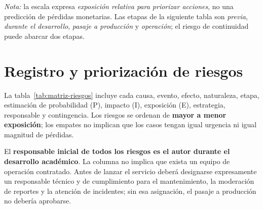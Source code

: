 \noindent\textit{Nota:} la escala expresa \emph{exposición relativa para priorizar acciones}, no una predicción de pérdidas monetarias. Las etapas de la siguiente tabla son \emph{previa}, \emph{durante el desarrollo}, \emph{pasaje a producción} y \emph{operación}; el riesgo de continuidad puede abarcar dos etapas.

\section{Registro y priorización de riesgos}\label{sec:ml-registro-riesgos}

La tabla~\ref{tab:matriz-riesgos} incluye cada causa, evento, efecto, naturaleza, etapa, estimación de probabilidad (P), impacto (I), exposición (E), estrategia, responsable y contingencia. Los riesgos se ordenan de \textbf{mayor a menor exposición}; los empates no implican que los casos tengan igual urgencia ni igual magnitud de pérdidas.

El \textbf{responsable inicial de todos los riesgos es el autor durante el desarrollo académico}. La columna no implica que exista un equipo de operación contratado. Antes de lanzar el servicio deberá designarse expresamente un responsable técnico y de cumplimiento para el mantenimiento, la moderación de reportes y la atención de incidentes; sin esa asignación, el pasaje a producción no debería aprobarse.

